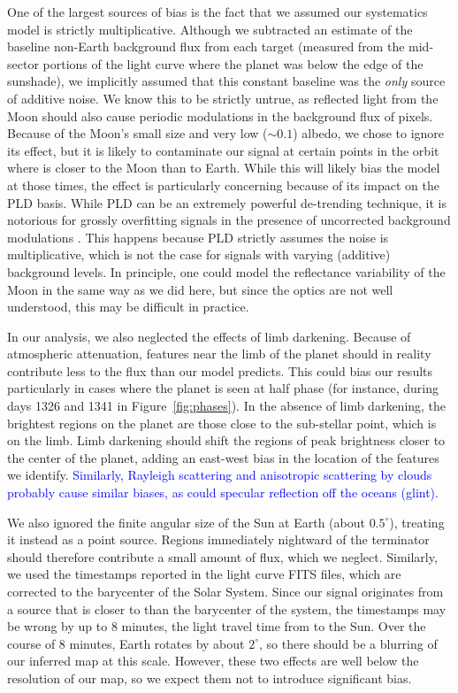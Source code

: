 \documentclass[modern]{aastex62}
\newcommand{\edited}[1]{\textcolor{blue}{#1}}
\begin{document}
One of the largest sources of bias is the fact that we assumed our
systematics model is strictly multiplicative. Although we subtracted
an estimate of the baseline non-Earth background flux from each target
(measured from the mid-sector portions of the light curve where the
planet was below the edge of the sunshade), we implicitly assumed
that this constant baseline was the \emph{only} source of additive
noise. We know this to be strictly untrue, as reflected light from the Moon 
should also cause periodic modulations
in the background flux of \TESS pixels. Because of the Moon's small size and
very low ($\sim 0.1$) albedo, we chose to ignore its effect, but it
is likely to contaminate our signal at certain points in the orbit
where \TESS is closer to the Moon than to Earth. While this will
likely bias the \starry model at those times, the effect is particularly
concerning because of its impact on the PLD basis. While PLD can be an
extremely powerful de-trending technique, it is notorious for
grossly overfitting signals in the presence of uncorrected background
modulations \citep{Luger2016}. This happens because PLD strictly
assumes the noise is multiplicative, which is not the case for 
signals with varying (additive) background levels. In principle, one
could model the reflectance variability of the Moon in the same way as
we did here, but since the optics are not well understood, this 
may be difficult in practice. 

In our analysis, we also neglected the effects of limb darkening. Because of
atmospheric attenuation, features near the limb of the planet should in
reality contribute less to the flux than our model predicts. This could
bias our results particularly in cases where the planet is seen at half
phase (for instance, during days 1326 and 1341 in Figure~\ref{fig:phases}).
In the absence of limb darkening, the brightest regions on the planet are those
close to the sub-stellar point, which is on the limb. Limb darkening should
shift the regions of peak brightness closer to the center of the planet, adding
an east-west bias in the location of the features we identify.
\edited{%
Similarly, Rayleigh scattering and anisotropic scattering by clouds probably cause 
similar biases, as could specular reflection off the oceans (glint).
}

We also ignored the finite angular size of the Sun at Earth (about $0.5^\circ$),
treating it instead as a point source. Regions immediately nightward of the 
terminator should therefore contribute a small amount of flux, which we neglect.
Similarly, we used the timestamps reported in the \tess light curve
FITS files, which are corrected to the barycenter of the Solar System. Since
our signal originates from a source that is closer to \tess than the
barycenter of the system, the timestamps may be wrong by up to 8 minutes,
the light travel time from \tess to the Sun. Over the course of 8 minutes, Earth rotates
by about $2^\circ$, so there should be a blurring of our inferred map at
this scale. However, these two effects
are well below the resolution of our map, so we expect
them not to introduce significant bias.
\end{document}
